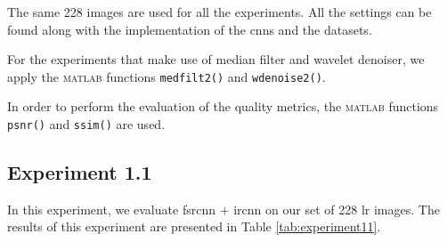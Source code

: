 The same 228 images are used for all the experiments. All the settings can be found along with the implementation of the \glspl{cnn} and the datasets. 

For the experiments that make use of median filter and wavelet denoiser, we apply the \textsc{matlab} functions \texttt{medfilt2()} and \texttt{wdenoise2()}.

In order to perform the evaluation of the quality metrics, the \textsc{matlab} functions \texttt{psnr()} and \texttt{ssim()} are used.

\newpage\subsection{Experiment 1.1}
In this experiment, we evaluate \gls{fsrcnn} $+$ \gls{ircnn} on our set of 228 \gls{lr} images. The results of this experiment are presented in Table \ref{tab:experiment11}.

